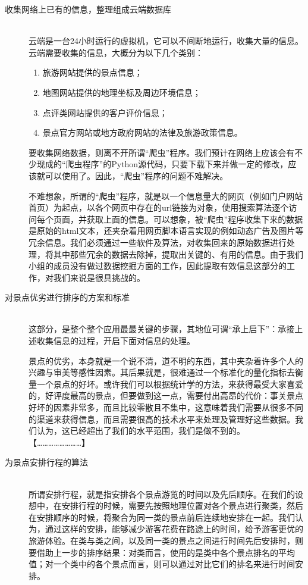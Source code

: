 \documentclass[12pt,a4paper]{article}
\begin{document}
\begin{CJK}{UTF8}{gbsn}
	\begin{description}
	\item[收集网络上已有的信息，整理组成云端数据库] \hfill \\
	云端是一台24小时运行的虚拟机，它可以不间断地运行，收集大量的信息。云端需要收集的信息，大概分为以下几个类别：
		\begin{enumerate}
		\item	旅游网站提供的景点信息；
		\item	地图网站提供的地理坐标及周边环境信息；
		\item	点评类网站提供的客户评价信息；
		\item	景点官方网站或地方政府网站的法律及旅游政策信息。
		\end{enumerate}
	
	要收集网络数据，则离不开所谓“爬虫”程序。我们预计在网络上应该会有不少现成的“爬虫程序”的Python源代码，只要下载下来并做一定的修改，应该就可以使用了。因此，“爬虫”程序的问题不难解决。

	不难想象，所谓的“爬虫”程序，就是以一个信息量大的网页（例如门户网站首页）为起点，以各个网页中存在的url链接为对象，使用搜索算法逐个访问每个页面，并获取上面的信息。可以想象，被“爬虫”程序收集下来的数据是原始的html文本，还夹杂着用网页脚本语言实现的例如动态广告及图片等冗余信息。我们必须通过一些软件及算法，对收集回来的原始数据进行处理，将其中那些冗余的数据去除掉，提取出关键的、有用的信息。由于我们小组的成员没有做过数据挖掘方面的工作，因此提取有效信息这部分的工作，对我们来说是很具挑战的。
	
	\item[对景点优劣进行排序的方案和标准] \hfill \\
	这部分，是整个整个应用最最关键的步骤，其地位可谓“承上启下”：承接上述收集信息的过程，开启下面对信息的处理。
	
	景点的优劣，本身就是一个说不清，道不明的东西，其中夹杂着许多个人的兴趣与审美等感性因素。其后果就是，很难通过一个标准化的量化指标去衡量一个景点的好坏。或许我们可以根据统计学的方法，来获得最受大家喜爱的，好评度最高的景点，但要做到这一点，需要付出高昂的代价：事关景点好坏的因素非常多，而且比较零散且不集中，这意味着我们需要从很多不同的渠道来获得信息，而且需要很高的技术水平来处理及管理好这些数据。我们认为，这已经超出了我们的水平范围，我们是做不到的。
	{\color{red} 【……………………】}

	\item[为景点安排行程的算法] \hfill \\
	所谓安排行程，就是指安排各个景点游览的时间以及先后顺序。在我们的设想中，在安排行程的时候，需要先按照地理位置对各个景点进行聚类，然后在安排顺序的时候，将聚合为同一类的景点前后连续地安排在一起。我们认为，通过这样的安排，能够减少游客花费在路途上的时间，给予游客更优的旅游体验。在类与类之间，以及同一类的景点之间进行时间先后安排时，则要借助上一步的排序结果：对类而言，使用的是类中各个景点排名的平均值；对一个类中的各个景点而言，则可以通过对比它们的排名来进行时间安排。


\end{description}
\end{CJK}
\end{document}
